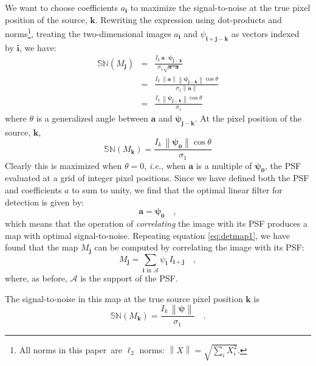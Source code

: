 \documentclass[letterpaper,preprint]{aastex62}
\newcommand{\doctype}{paper}
\newcommand{\latin}[1]{\emph{#1}}
\newcommand{\ie}{\latin{i.e.}}
\newcommand{\psf}{\psi}
\newcommand{\psfat}[1]{\psf_{#1}}
\newcommand{\signoise}{[S/N]}
\newcommand{\snr}[1]{\mathbb{SN}(#1)}
\newcommand{\norm}[1]{\left\lVert #1 \right\rVert}
\renewcommand{\vec}[1]{\boldsymbol{#1}}
\newcommand{\avec}{\vec{a}}
\newcommand{\ivec}{\vec{i}}
\newcommand{\jvec}{\vec{j}}
\newcommand{\kvec}{\vec{k}}
\newcommand{\iina}{\ivec \,\, \mathrm{in} \,\, \mathcal{A}}
\begin{document}
We want to choose coefficients $a_{\ivec}$ to maximize the 
signal-to-noise at the true pixel position of the source,
$\kvec$.  Rewriting the expression using dot-products and
norms\footnote{All norms in this \doctype\ are $\ell_2$ norms: $\norm{X} =
  \sqrt{\sum_i X_i^2}$.}, treating the two-dimensional images
$a_{\ivec}$ and $\psfat{\ivec + \jvec - \kvec}$ as vectors indexed by
$\ivec$, we have:
\begin{eqnarray}
  \snr{M_{\jvec}} &=& \frac{I_k \, \avec \cdot \bm{\psfat{j-k}}}{\sigma_1 \sqrt{\avec \cdot \avec}} \label{eqn:psfdotprod} \\
 &=& \frac{I_k \, \norm{\avec} \norm{\bm{\psfat{j-k}}} \cos \theta}{\sigma_1 \norm{\avec}} \\
 &=& \frac{I_k \, \norm{\bm{\psfat{j-k}}} \cos \theta}{\sigma_1}
\end{eqnarray}
where $\theta$ is a generalized angle between $\avec$ and $\bm{\psfat{j-k}}$.
At the pixel position of the source, $\kvec$,
\begin{equation}
\snr{M_{\kvec}} = \frac{I_k \, \norm{\bm{\psfat{0}}} \cos \theta}{\sigma_1}
\label{eqn:sndsingle}
\end{equation}
Clearly this is maximized when $\theta = 0$, \ie, when $\avec$ is a
multiple of $\bm{\psfat{0}}$, the PSF evaluated at a grid of integer
pixel positions.  Since we have defined both the PSF and coefficients
$a$ to sum to unity, we find that the optimal linear filter for
detection is given by:
\begin{equation}
\avec = \bm{\psfat{0}} \quad ,
\end{equation}
which means that the operation of \emph{correlating} the image with
its PSF produces a map with optimal signal-to-noise.  Repeating
equation \ref{eq:detmap1}, we have found that the map $M_{\jvec}$ can
be computed by correlating the image with its PSF:
\begin{equation}
M_{\jvec} = \sum_{\iina} \psfat{\ivec} \, I_{\ivec + \jvec} \quad ,
\end{equation}
where, as before, $\mathcal{A}$ is the support of the PSF.

The signal-to-noise in this map at the true source pixel
position $\kvec$ is
\begin{equation}
\snr{M_{\kvec}} = \frac{I_k \, \norm{\bm{\psfat{}}}}{\sigma_1} \quad .
\end{equation}
\end{document}
